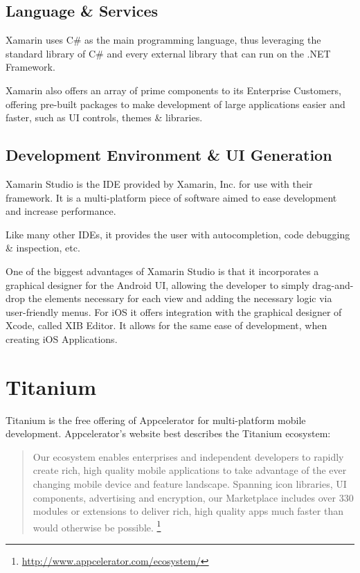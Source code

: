 \subsection{Language \& Services}
Xamarin uses C\# as the main programming language, thus leveraging the standard library of C\# and every external library that can run on the .NET Framework.

Xamarin also offers an array of prime components to its Enterprise Customers, offering pre-built packages to make development of large applications easier and faster, such as \ac{UI} controls, themes \& libraries.

 


\subsection{Development Environment \& UI Generation}
Xamarin Studio is the \ac{IDE} provided by Xamarin, Inc. for use with their framework. It is a multi-platform piece of software aimed to ease development and increase performance.

Like many other \ac{IDE}s, it provides the user with autocompletion, code debugging \& inspection, etc.

One of the biggest advantages of Xamarin Studio is that it incorporates a graphical designer for the Android \ac{UI}, allowing the developer to simply drag-and-drop the elements necessary for each view and adding the necessary logic via user-friendly menus. For iOS it offers integration with the graphical designer of Xcode, called XIB Editor. It allows for the same ease of development, when creating iOS Applications. 


\section{Titanium}
Titanium is the free offering of Appcelerator for multi-platform mobile development. Appcelerator's website best describes the Titanium ecosystem:
\begin{quotation}
Our ecosystem enables enterprises and independent developers to rapidly create rich, high quality mobile applications to take advantage of the ever changing mobile device and feature landscape.
Spanning icon libraries, UI components, advertising and encryption, our Marketplace includes over 330 modules or extensions to deliver rich, high quality apps much faster than would otherwise be possible.
\footnote{\url{http://www.appcelerator.com/ecosystem/}}
\end{quotation}
 


